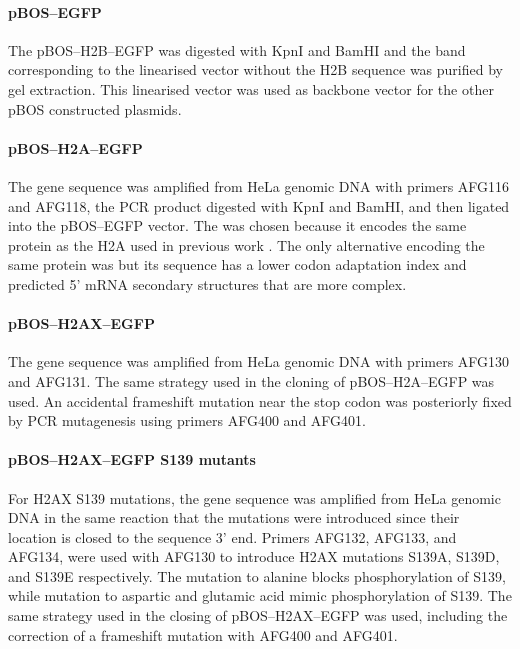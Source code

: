       \paragraph{pBOS--EGFP}
      The pBOS--H2B--EGFP was digested with KpnI and BamHI and the
      band corresponding to the linearised vector without the H2B
      sequence was purified by gel extraction.  This linearised vector
      was used as backbone vector for the other pBOS constructed
      plasmids.

      \paragraph{pBOS--H2A--EGFP}
      The  gene sequence was amplified from HeLa
      genomic DNA with primers AFG116 and AFG118, the PCR product
      digested with KpnI and BamHI, and then ligated into the
      pBOS--EGFP vector.  The  was chosen because it
      encodes the same protein as the H2A used in previous work
      \citep{flaus2004sin}.  The only alternative encoding the same
      protein was  but its sequence has a lower codon
      adaptation index and predicted 5' mRNA secondary structures that
      are more complex.

      \paragraph{pBOS--H2AX--EGFP}
      The  gene sequence was amplified from HeLa genomic
      DNA with primers AFG130 and AFG131.  The same strategy used in
      the cloning of pBOS--H2A--EGFP was used.  An accidental
      frameshift mutation near the stop codon was posteriorly fixed by
      PCR mutagenesis using primers AFG400 and AFG401.

      \paragraph{pBOS--H2AX--EGFP S139 mutants}
      For H2AX S139 mutations, the  gene sequence was
      amplified from HeLa genomic DNA in the same reaction that the
      mutations were introduced since their location is closed to the
      sequence 3' end.  Primers AFG132, AFG133, and AFG134, were used
      with AFG130 to introduce H2AX mutations S139A, S139D, and S139E
      respectively.  The mutation to alanine blocks phosphorylation of
      S139, while mutation to aspartic and glutamic acid mimic
      phosphorylation of S139.  The same strategy used in the closing
      of pBOS--H2AX--EGFP was used, including the correction of a
      frameshift mutation with AFG400 and AFG401.


